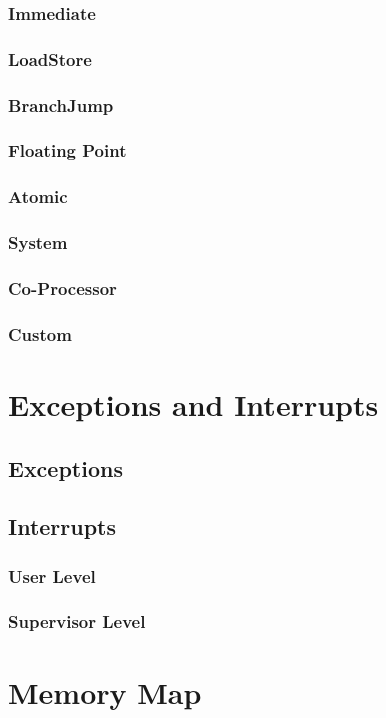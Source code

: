 \documentclass[letterpaper]{article}
\begin{document}
\subsubsection{Immediate}
\subsubsection{Load\/Store}
\subsubsection{Branch\/Jump}
\subsubsection{Floating Point}
\subsubsection{Atomic}
\subsubsection{System}
\subsubsection{Co-Processor}
\subsubsection{Custom}


\section{Exceptions and Interrupts}
\subsection{Exceptions}


\subsection{Interrupts}
\subsubsection{User Level}
\subsubsection{Supervisor Level}


\section{Memory Map}

\section{}
\end{document}
